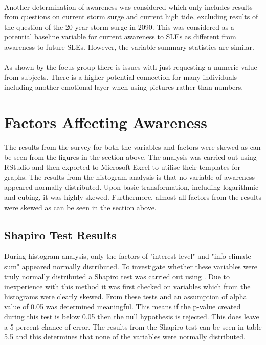 \paragraph{}
Another determination of awareness was considered which only includes results from questions on current storm surge and current high tide, excluding results of the question of the 20 year storm surge in 2090. This was considered as a potential baseline variable for current awareness to SLEs as different from awareness to future SLEs. However, the variable summary statistics are similar. 


\paragraph{}
As shown by the focus group there is issues with just requesting a numeric value from subjects. There is a higher potential connection for many individuals including another emotional layer when using pictures rather than numbers. 

\section{Factors Affecting Awareness}
The results from the survey for both the variables and factors were skewed as can be seen from the figures in the section above. The analysis was carried out using RStudio and then exported to Microsoft Excel to utilise their templates for graphs. The results from the histogram analysis is that no variable of awareness appeared normally distributed. Upon basic transformation, including logarithmic and cubing, it was highly skewed. Furthermore, almost all factors from the results were skewed as can be seen in the section above.   

\subsection{Shapiro Test Results}

During histogram analysis, only the factors of "interest-level" and "info-climate-sum" appeared normally distributed. To investigate whether these variables were truly normally distributed a Shapiro test was carried out using \cite{royston_extension_1982} . Due to inexperience with this method it was first checked on variables which from the histograms were clearly skewed. From these tests and \cite{royston_extension_1982} an assumption of alpha value of 0.05 was determined meaningful. This means if the p-value created during this test is below 0.05 then the null hypothesis is rejected. This does leave a 5 percent chance of error. The results from the Shapiro test can be seen in table 5.5 and this determines that none of the variables were normally distributed. 

